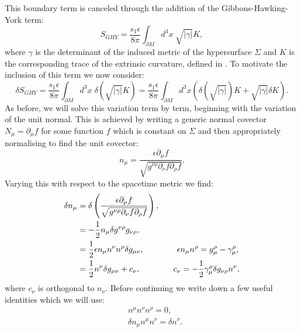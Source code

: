 This boundary term is canceled through the addition of the Gibbons-Hawking-York term:
\begin{equation}
	S_{GHY} = \frac{s_1 \epsilon}{8 \pi} \int_{\partial M} d^3 x \; \sqrt{|\gamma|} K,
\end{equation}
where $\gamma$ is the determinant of the induced metric of the hypersurface $\Sigma$ and $K$ is the corresponding trace of the extrinsic curvature, defined in .
To motivate the inclusion of this term we now consider:
\begin{equation*}
	\delta S_{GHY} = \frac{s_1 \epsilon}{8 \pi} \int_{\partial M}  d^3x \; \delta(\sqrt{|\gamma|} K) = \frac{s_1  \epsilon}{8 \pi} \int_{\partial M}  d^3 x  \left( \delta(\sqrt{|\gamma|})K + \sqrt{|\gamma|} \delta K \right) .
\end{equation*} 
As before, we will solve this variation term by term, beginning with the variation of the unit normal. This is achieved by writing a generic normal covector $N_\mu = \partial_\mu f$ for some function $f$ which is constant on $\Sigma$ and then appropriately normalising to find the unit covector: 
\begin{equation*}
	n_\mu = \frac{\epsilon \partial_\mu f}{ \sqrt{g^{\nu \rho} \partial_\nu f \partial_\rho f }}.
\end{equation*}
Varying this with respect to the spacetime metric we find:
\begin{equation*}
	\begin{aligned}
		\delta n_\mu &= \delta \left( \frac{\epsilon \partial_\mu f}{ \sqrt{g^{\nu \rho} \partial_\nu f \partial_\rho f }} \right), \\
		&= -\frac{1}{2} n_\mu \delta g^{\nu \rho} g_{\nu \rho}, \\
		&= \frac{1}{2} \epsilon n_\mu n^\nu n^\rho \delta g_{\mu \nu}, \qquad \qquad \epsilon n_\mu n^\rho = g^\rho_\mu - \gamma^\rho_\mu, \\
		&= \frac{1}{2} n^\nu \delta g_{\mu \nu} + c_\nu, \qquad \qquad c_\nu = -\frac{1}{2} \gamma^\rho_\mu \delta g_{\nu \rho} n^\nu ,
	\end{aligned}
\end{equation*}
where $c_\nu$ is orthogonal to $n_\nu$. Before continuing we write down a few useful identities which we will use:
\begin{equation*}
\begin{aligned}
		&n^\mu n^\nu n^\rho = 0, \\
		&\delta n_\mu n^\mu n^\nu = \delta n^\nu.
\end{aligned}
\end{equation*}
